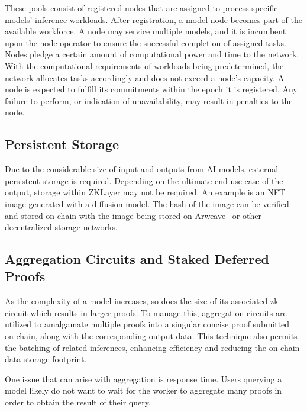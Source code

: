 \documentclass[conference]{IEEEtran}
\begin{document}
These pools consist of registered nodes that are assigned to process specific models' inference workloads. After registration, a model node becomes part of the available workforce. A node may service multiple models, and it is incumbent upon the node operator to ensure the successful completion of assigned tasks. Nodes pledge a certain amount of computational power and time to the network. With the computational requirements of workloads being predetermined, the network allocates tasks accordingly and does not exceed a node's capacity. A node is expected to fulfill its commitments within the epoch it is registered. Any failure to perform, or indication of unavailability, may result in penalties to the node.


\subsection{Persistent Storage}

Due to the considerable size of input and outputs from AI models, external persistent storage is required. Depending on the ultimate end use case of the output, storage within ZKLayer may not be required. An example is an NFT image generated with a diffusion model. The hash of the image can be verified and stored on-chain with the image being stored on Arweave~\cite{Arweave} or other decentralized storage networks.


\subsection{Aggregation Circuits and Staked Deferred Proofs}

As the complexity of a model increases, so does the size of its associated zk-circuit which results in larger proofs. To manage this, aggregation circuits are utilized to amalgamate multiple proofs into a singular concise proof submitted on-chain, along with the corresponding output data. This technique also permits the batching of related inferences, enhancing efficiency and reducing the on-chain data storage footprint.

One issue that can arise with aggregation is response time. 
Users querying a model likely do not want to wait for the worker to aggregate many proofs in order to obtain the result of their query.
\end{document}
